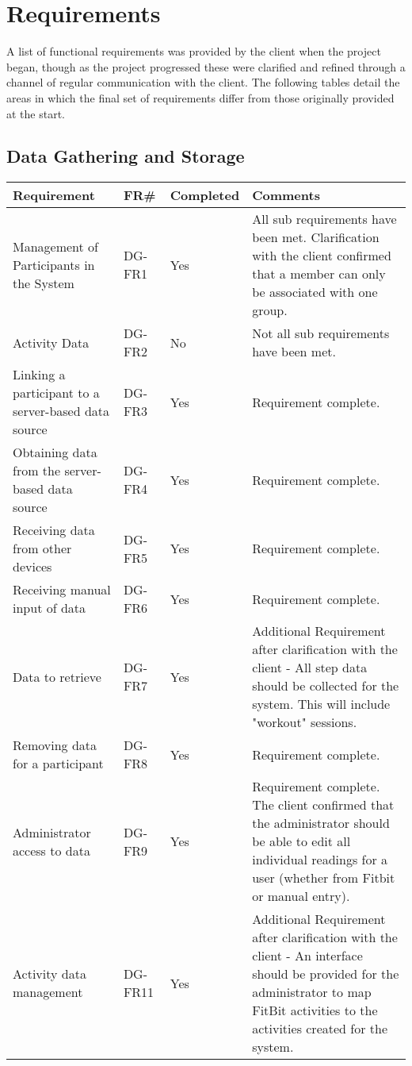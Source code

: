 \label{Requirements_chpt}
\chapter{Requirements}

A list of functional requirements was provided by the client when the project began, though as the project progressed these were clarified and refined through a channel of regular communication with the client. The following tables detail the areas in which the final set of requirements differ from those originally provided at the start.

\section{Data Gathering and Storage}
\begin{tabular}{ |p{5cm}|l|l|p{8cm}|}
\hline
\textbf{Requirement}	&	\textbf{FR\#}	&	\textbf{Completed}	&	\textbf{Comments} \\
\hline
Management of Participants in the System			& DG-FR1	& Yes	& All sub requirements have been met. Clarification with the client confirmed that a member can only be associated with one group. \\
\hline
Activity Data										& DG-FR2	& No	& Not all sub requirements have been met. \\
\hline
Linking a participant to a server-based data source	& DG-FR3	& Yes	& Requirement complete. \\
\hline
Obtaining data from the server-based data source	& DG-FR4	& Yes	& Requirement complete. \\
\hline
Receiving data from other devices					& DG-FR5	& Yes	& Requirement complete. \\
\hline
Receiving manual input of data						& DG-FR6	& Yes	& Requirement complete. \\
\hline
Data to retrieve 									& DG-FR7	& Yes	& Additional Requirement after clarification with the client - All step data should be collected for the system. This will include "workout" sessions. \\
\hline
Removing data for a participant						& DG-FR8	& Yes	&  Requirement complete. \\
\hline
Administrator access to data						& DG-FR9	& Yes	& Requirement complete. The client confirmed that the administrator should be able to edit all individual readings for a user (whether from Fitbit or manual entry).\\
\hline
Activity data management							& DG-FR11	& Yes	& Additional Requirement after clarification with the client - An interface should be provided for the administrator to map FitBit activities to the activities created for the system. \\
\hline
\end{tabular}

